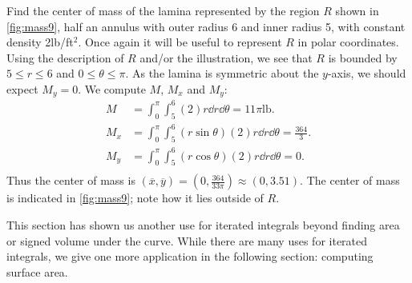 \begin{example}\label{ex_mass9}
Find the center of mass of the lamina represented by the region $R$ shown in \autoref{fig:mass9}, half an annulus with outer radius 6 and inner radius 5, with constant density 2lb/ft$^{2}$.
\solution
Once again it will be useful to represent $R$ in polar coordinates. Using the description of $R$ and/or the illustration, we see that $R$ is bounded by $5\leq r\leq 6$ and $0\leq\theta\leq\pi$. As the lamina is symmetric about the $y$-axis, we should expect $M_y=0$. We compute $M$, $M_x$ and $M_y$:
\begin{align*}
M &= \int_0^{\pi}\int_5^6 (2)r\dd r\dd\theta = 11\pi\text{lb}.\\
M_x &= \int_0^{\pi}\int_5^6 (r\sin\theta)(2)r\dd r\dd\theta = \frac{364}3%
.\\
M_y &= \int_0^{\pi}\int_5^6 (r\cos\theta)(2)r\dd r\dd\theta = 0.\\
\end{align*}
Thus the center of mass is $(\overline{x},\overline{y}) = \left(0,\frac{364}{33\pi}\right) \approx (0,3.51).$ The center of mass is indicated in \autoref{fig:mass9}; note how it lies outside of $R$.
\end{example}

This section has shown us another use for iterated integrals beyond finding area or signed volume under the curve. While there are many uses for iterated integrals, we give one more application in the following section: computing surface area.

